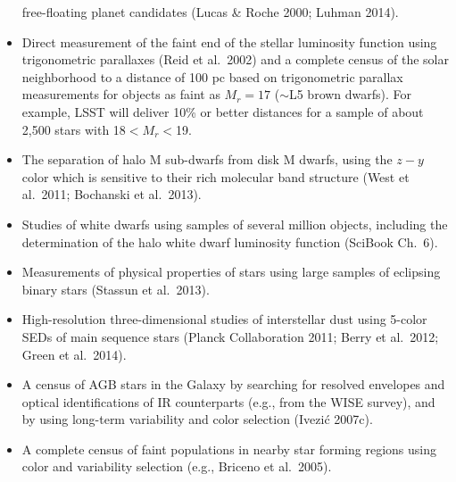 \documentclass{emulateapj}
\begin{document}
\begin{itemize}
          free-floating planet candidates (Lucas \& Roche 2000; Luhman 2014).
\item Direct measurement of the faint end of the stellar luminosity function
          using trigonometric parallaxes (Reid et al.~2002) and a complete census of the
          solar neighborhood to a distance of 100 pc based on trigonometric parallax measurements for objects as faint as 
          $M_r=17$ ($\sim$L5 brown dwarfs). For example, LSST will deliver 10\% or better distances for a sample of about 2,500 stars
          with 18$<M_r<$19. %
\item The separation of halo M sub-dwarfs from disk M dwarfs, using the $z-y$ color which is sensitive to their rich molecular band 
          structure (West et al.~2011; Bochanski et al.~2013).
\item Studies of white dwarfs using samples of several million objects, including the determination of the halo white dwarf luminosity 
          function (SciBook Ch.~6). 
\item Measurements of physical properties of stars using large samples of eclipsing binary stars (Stassun et al.~2013). 
\item High-resolution three-dimensional studies of interstellar dust using 5-color
          SEDs of main sequence stars (Planck Collaboration 2011; Berry et al.~2012; Green et al.~2014).
\item A census of AGB stars in the Galaxy by searching for resolved envelopes and optical  identifications of IR counterparts
         (e.g., from the WISE survey), and by using long-term variability and color selection (Ivezi\'{c} 2007c).
\item A complete census of faint populations in nearby star forming regions using
          color and variability selection (e.g., Briceno et al.~2005).
\end{itemize}
\end{document}
